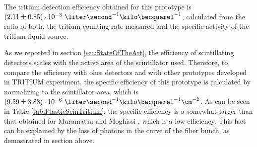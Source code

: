 The tritium detection efficiency obtained for this prototype is $(2.11 \pm 0.85)\cdot{} 10^{-3}~\liter\second^{-1}\kilo\becquerel^{-1}$, calculated from the ratio of both, the tritium counting rate measured and the specific activity of the tritium liquid source. 

As we reported in section \ref{sec:StateOfTheArt}, the efficiency of scintillating detectors scales with the active area of the scintillator used. Therefore, to compare the efficiency with oher detectors and with other prototypes developed in TRITIUM experiment, the specific efficiency of this prototype is calculated by normalizing to the scintillator area, which is $(9.59 \pm 3.88)\cdot{} 10^{-6}~\liter\second^{-1}\kilo\becquerel^{-1}\cm^{-2}$. As can be seen in Table \ref{tab:PlasticScinTritium}, the specific efficiency is a somewhat larger than that obtained for Muramatsu and Moghissi \cite{Moghissi}, which is a low efficiency. This fact can be explained by the loss of photons in the curve of the fiber bunch, as demostrated in section above.